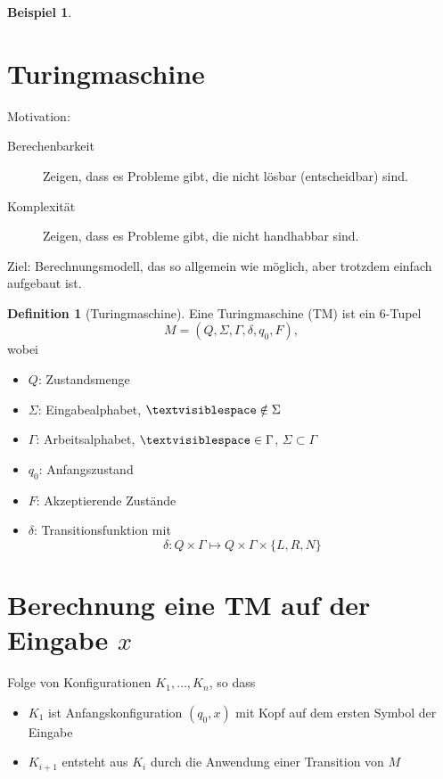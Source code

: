 \documentclass[11pt]{article} %
\theoremstyle{definition}
\newtheorem*{beispiel}{Beispiel}
\newtheorem{definition}{Definition}
\begin{document}
\begin{beispiel}
\begin{enumerate}
\end{enumerate}
\end{beispiel}

\section{Turingmaschine}

Motivation:
\begin{description}
\item[Berechenbarkeit] Zeigen, dass es Probleme gibt, die nicht lösbar (entscheidbar) sind.
\item[Komplexität] Zeigen, dass es Probleme gibt, die nicht handhabbar sind.
\end{description}

Ziel:
Berechnungsmodell, das so allgemein wie möglich, aber trotzdem einfach aufgebaut ist.

\begin{definition}[Turingmaschine]
Eine Turingmaschine (TM) ist ein 6-Tupel
\[
M = (Q, \Sigma, \Gamma, \delta, q_0, F),
\]
wobei
\begin{itemize}
\item $Q$: Zustandsmenge
\item $\Sigma$: Eingabealphabet, $\textvisiblespace \notin \Sigma$
\item $\Gamma$: Arbeitsalphabet, $\textvisiblespace \in \Gamma$, $\Sigma \subset \Gamma$
\item $q_0$: Anfangszustand
\item $F$: Akzeptierende Zustände
\item $\delta$: Transitionsfunktion mit
\[
\delta: Q\times \Gamma \mapsto Q \times \Gamma \times \{L,R,N\}
\]
\end{itemize}

\end{definition}

\section{Berechnung eine TM auf der Eingabe $x$}

Folge von Konfigurationen $K_1, \dots, K_n$, so dass
\begin{itemize}
\item $K_1$ ist Anfangskonfiguration $(q_0, x)$ mit Kopf auf dem ersten Symbol der Eingabe
\item $K_{i+1}$ entsteht aus $K_i$ durch die Anwendung einer Transition von $M$

\end{itemize}
\end{document}
